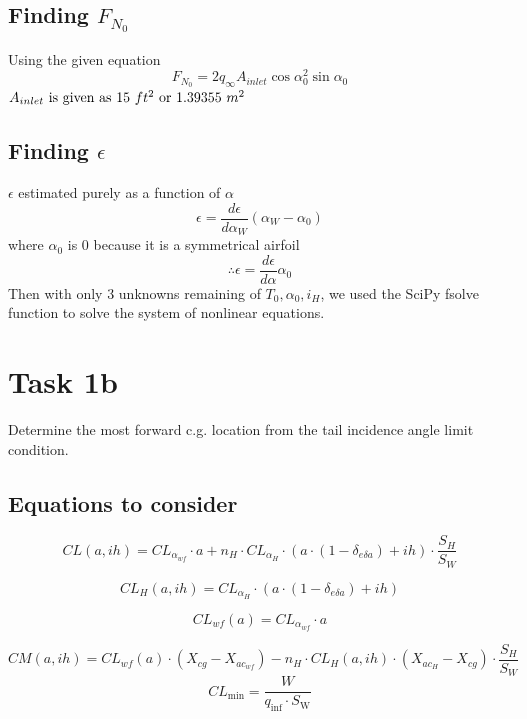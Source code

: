 \documentclass[a4paper, twoside]{article}
\begin{document}
\subsection{Finding \(F_{N_0}\)}
Using the given equation
\[F_{N_0} = 2 q_\infty A_{inlet} \cos\alpha_0^2 \sin\alpha_0\]
\(A_{inlet}$ is given as 15 $ft^2$ or 1.39355 $m^2\)
\subsection{Finding \(\epsilon\)}
\(\epsilon\) estimated purely as a function of \(\alpha\)
\[\epsilon = \frac{d\epsilon}{d\alpha_W} (\alpha_W-\alpha_0)\]
where \(\alpha_0\) is 0 because it is a symmetrical airfoil
\[\therefore \epsilon  = \frac{d\epsilon}{d\alpha}\alpha_0 \]
Then with only 3 unknowns remaining of \(T_0,\alpha_0,i_H\), we used the SciPy fsolve function to solve the system of nonlinear equations.

\section{Task 1b}
Determine the most forward c.g. location from the tail incidence angle limit condition. \\
\subsection{Equations to consider}
\begin{equation}
CL(a, ih) = CL_{\alpha_{wf}} \cdot a + n_H \cdot CL_{\alpha_H} \cdot \left(a \cdot (1 - \delta_{e\delta a}) + ih\right) \cdot \frac{S_H}{S_W}
\end{equation}

\begin{equation}
CL_H(a, ih) = CL_{\alpha_H} \cdot \left(a \cdot (1 - \delta_{e\delta a}) + ih\right)
\end{equation}

\begin{equation}
CL_{wf}(a) = CL_{\alpha_{wf}} \cdot a
\end{equation}

\begin{equation}
CM(a, ih) = CL_{wf}(a) \cdot (X_{cg} - X_{ac_{wf}}) - n_H \cdot CL_H(a, ih) \cdot (X_{ac_H} - X_{cg}) \cdot \frac{S_H}{S_W}
\end{equation}
\begin{equation}
  CL_{\text{min}} = \frac{W}{q_{\text{inf}}\cdot S_{\text{W}}}
\end{equation}
\pagebreak
\end{document}
